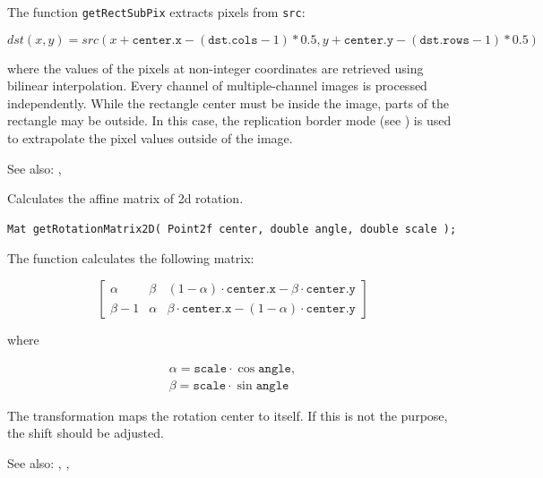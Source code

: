 The function \texttt{getRectSubPix} extracts pixels from \texttt{src}:

\[
dst(x, y) = src(x + \texttt{center.x} - (\texttt{dst.cols}-1)*0.5, y + \texttt{center.y} - (\texttt{dst.rows}-1)*0.5)
\]

where the values of the pixels at non-integer coordinates are retrieved
using bilinear interpolation. Every channel of multiple-channel
images is processed independently. While the rectangle center
must be inside the image, parts of the rectangle may be
outside. In this case, the replication border mode (see ) is used to extrapolate
the pixel values outside of the image.

See also: , 

\label{getRotationMatrix2D}
Calculates the affine matrix of 2d rotation.

\begin{lstlisting}
Mat getRotationMatrix2D( Point2f center, double angle, double scale );
\end{lstlisting}
\begin{description}
\end{description}

The function calculates the following matrix:

\[
\begin{bmatrix}
\alpha & \beta & (1-\alpha) \cdot \texttt{center.x} - \beta \cdot \texttt{center.y} \\
\beta - 1 & \alpha & \beta \cdot \texttt{center.x} - (1-\alpha) \cdot \texttt{center.y}
\end{bmatrix}
\]

where

\[
\begin{array}{l}
\alpha = \texttt{scale} \cdot \cos \texttt{angle},\\
\beta = \texttt{scale} \cdot \sin \texttt{angle}
\end{array}
\]

The transformation maps the rotation center to itself. If this is not the purpose, the shift should be adjusted.

See also: , , 


